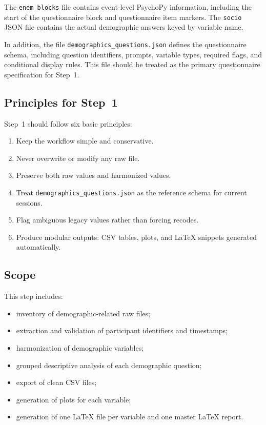 The \texttt{enem\_blocks} file contains event-level PsychoPy information, including the start of the
questionnaire block and questionnaire item markers.
The \texttt{socio} JSON file contains the actual demographic answers keyed by variable name.

In addition, the file \texttt{demographics\_questions.json} defines the questionnaire schema, including
question identifiers, prompts, variable types, required flags, and conditional display rules.
This file should be treated as the primary questionnaire specification for Step~1. \cite{step1_demo_schema}

\subsection{Principles for Step~1}
Step~1 should follow six basic principles:
\begin{enumerate}
    \item Keep the workflow simple and conservative.
    \item Never overwrite or modify any raw file.
    \item Preserve both raw values and harmonized values.
    \item Treat \texttt{demographics\_questions.json} as the reference schema for current sessions.
    \item Flag ambiguous legacy values rather than forcing recodes.
    \item Produce modular outputs: CSV tables, plots, and \LaTeX{} snippets generated automatically.
\end{enumerate}

\subsection{Scope}
This step includes:
\begin{itemize}
    \item inventory of demographic-related raw files;
    \item extraction and validation of participant identifiers and timestamps;
    \item harmonization of demographic variables;
    \item grouped descriptive analysis of each demographic question;
    \item export of clean CSV files;
    \item generation of plots for each variable;
    \item generation of one \LaTeX{} file per variable and one master \LaTeX{} report.
\end{itemize}

